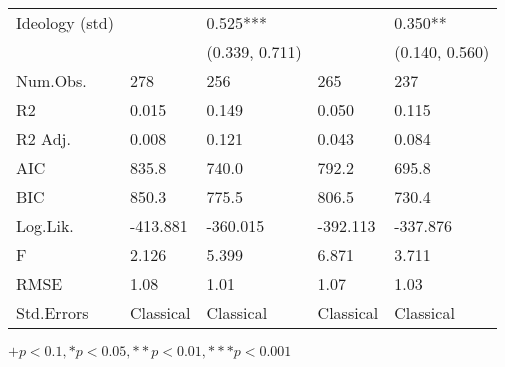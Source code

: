 \begin{table}[th!]
\begin{threeparttable}
\begin{tabular}{lC{3cm}C{3cm}C{3cm}C{3cm}}
 Ideology (std) &                 &                0.525*** &                 &                  0.350** \\
                &                 &          (0.339, 0.711) &                 &           (0.140, 0.560) \\
       Num.Obs. &             278 &                     256 &             265 &                      237 \\
             R2 &           0.015 &                   0.149 &           0.050 &                    0.115 \\
        R2 Adj. &           0.008 &                   0.121 &           0.043 &                    0.084 \\
            AIC &           835.8 &                   740.0 &           792.2 &                    695.8 \\
            BIC &           850.3 &                   775.5 &           806.5 &                    730.4 \\
       Log.Lik. &        -413.881 &                -360.015 &        -392.113 &                 -337.876 \\
              F &           2.126 &                   5.399 &           6.871 &                    3.711 \\
           RMSE &            1.08 &                    1.01 &            1.07 &                     1.03 \\
     Std.Errors &       Classical &               Classical &       Classical &                Classical \\
\bottomrule
\end{tabular}
\begin{tablenotes}
\item \footnotesize $+ p < 0.1, * p < 0.05, ** p < 0.01, *** p < 0.001$
\end{tablenotes}
\end{threeparttable}
\end{table}
